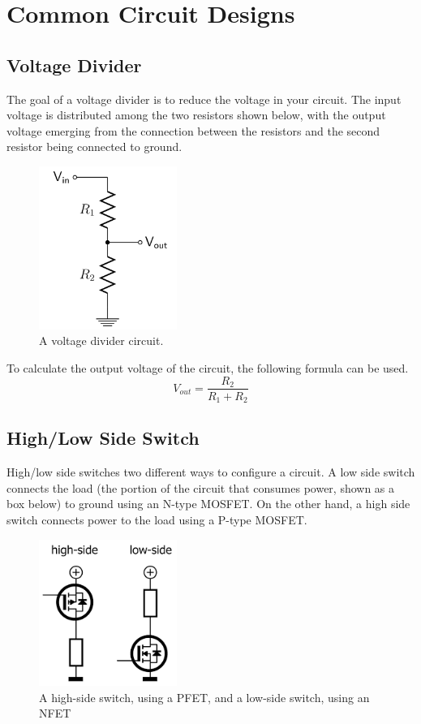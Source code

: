 \documentclass{article}
\begin{document}
\pagebreak

\section{Common Circuit Designs}

\subsection{Voltage Divider}
The goal of a voltage divider is to reduce the voltage in your circuit. The input voltage is distributed among the two resistors shown below, with the output voltage emerging from the connection between the resistors and the second resistor being connected to ground.

\begin{figure}[h]
    \centering
    \includegraphics[width=0.4\textwidth]{img/Voltage_Div.png}
    \caption{A voltage divider circuit.}
    \label{fig:VoltageDiv}
\end{figure}

To calculate the output voltage of the circuit, the following formula can be used. 
$$
V_{out} = \frac{R_{2}}{R_{1} + R_{2}}
$$

\subsection{High/Low Side Switch}
High/low side switches two different ways to configure a circuit. A low side switch connects the load (the portion of the circuit that consumes power, shown as a box below) to ground using an N-type MOSFET. On the other hand, a high side switch connects power to the load using a P-type MOSFET.

\begin{figure} [h]
    \centering
    \includegraphics[width=0.4\textwidth]{img/high_low_switch.png}
    \caption{A high-side switch, using a PFET, and a low-side switch, using an NFET }
    \label{fig:my_label}
\end{figure}
\end{document}
